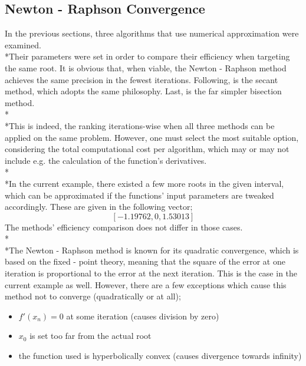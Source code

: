 \documentclass{article}
\begin{document}
\subsection{Newton - Raphson Convergence}
In the previous sections, three algorithms that use numerical approximation were examined.
\\*Their parameters were set in order to compare their efficiency when targeting the
same root. It is obvious that, when viable, the Newton - Raphson method achieves the
same precision in the fewest iterations. Following, is the secant method, which
adopts the same philosophy. Last, is the far simpler bisection method.
\\*\\*This is indeed, the ranking iterations-wise when all three methods can be
applied on the same problem. However, one must select the most suitable option,
considering the total computational cost per algorithm, which may or may not include
e.g. the calculation of the function's derivatives.
\\*\\*In the current example, there existed a few more roots in the given interval,
which can be approximated if the functions' input parameters are tweaked
accordingly. These are given in the following vector;\[[-1.19762, 0, 1.53013]\]The methods' efficiency comparison does not differ in those cases.
\\*\\*The Newton - Raphson method is known for its quadratic convergence, which is based on
the fixed - point theory, meaning that the square of the error at one iteration is
proportional to the error at the next iteration. This is the case in the current example as
well. However, there are a few exceptions which cause this method not to converge (quadratically or at all);
\begin{itemize}
    \item $f'(x_n)=0$ at some iteration (causes division by zero)
    \item $x_0$ is set too far from the actual root
    \item the function used is hyperbolically convex (causes divergence towards infinity)
\end{itemize}
\pagebreak
\end{document}
